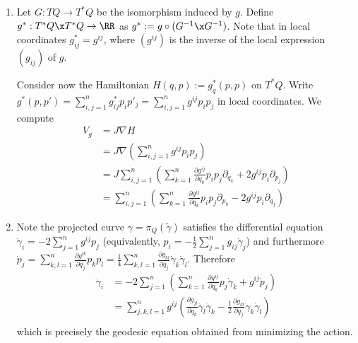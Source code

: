 
 
\begin{enumerate}
    \item Let $G:TQ\to T^*Q$ be the isomorphism induced by $g$. Define $g^*:T^*Q\x T^*Q \to \RR$  as $g^*:=g\circ (G^{-1}\x G^{-1})$. Note that in local coordinates $g^*_{ij}=g^{ij}$, where $(g^{ij})$ is the inverse of the local expression $(g_{ij})$ of $g$.
    
    Consider now the Hamiltonian $H(q,p):=g_q^*(p,p)$ on $T^*Q$. Write $g^*(p,p')=\sum_{i,j=1}^n g^*_{ij}p_i p'_j=\sum_{i,j=1}^n g^{ij}p_i p_j$ in local coordinates. We compute
    \begin{align*}
        V_g&=J\nabla H\\
        &=J\nabla\left(\sum_{i,j=1}^n g^{ij}p_ip_j\right)\\
        &=J\sum_{i,j=1}^n\left(\sum_{k=1}^n\frac{\partial g^{ij}}{\partial q_k} p_ip_j\partial_{q_k}+2g^{ij}p_i\partial_{p_j}\right)\\
        &=\sum_{i,j=1}^n\left(\sum_{k=1}^n\frac{\partial g^{ij}}{\partial q_k} p_ip_j\partial_{p_k}-2g^{ij}p_i\partial_{q_j}\right)
    \end{align*}
    
    \item Note the projected curve $\gamma=\pi_Q(\tilde\gamma)$ satisfies the differential equation $\dot\gamma_i=-2\sum_{j=1}^n g^{ij}p_j$ (equivalently, $p_i=-\frac{1}{2}\sum_{j=1}^n g_{ij} \dot \gamma_j$) and furthermore $\dot p_j=\sum_{k,l=1}^n \frac{\partial g^{lk}}{\partial q_j}p_kp_l=\frac{1}{4}\sum_{k,l=1}^n\frac{\partial g_{kl}}{\partial q_j}\dot\gamma_k\dot\gamma_l$. Therefore
    \begin{align*}
        \ddot\gamma_i&=-2\sum_{j=1}^n \left(\sum_{k=1}^n \frac{\partial g^{ij}}{\partial q_k}p_j\dot\gamma_k+g^{ij}\dot p_j\right)\\
        &=\sum_{j,k,l=1}^ng^{ij}\left(\frac{\partial g_{jl}}{\partial q_k}\dot\gamma_l\dot\gamma_k-\frac{1}{2}\frac{\partial g_{kl}}{\partial q_j}\dot\gamma_k\dot\gamma_l\right)\\
    \end{align*}
    which is precisely the geodesic equation obtained from minimizing the action.
    

\end{enumerate}
